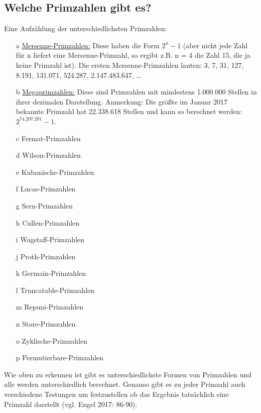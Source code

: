 \documentclass[german,12pt,a4paper]{article}
\begin{document}
\subsection{Welche Primzahlen gibt es?}
Eine Aufzählung der unterschiedlichsten Primzahlen:
\begin{itemize}
\item [a]\underline{Mersenne-Primzahlen:} Diese haben die Form $2^{n}-1$ (aber nicht jede Zahl für n liefert  eine Mersenne-Primzahl, so ergibt z.B. n = 4 die Zahl 15, die ja keine Primzahl ist).
Die ersten Mersenne-Primzahlen lauten: 3, 7, 31, 127, 8.191, 131.071, 524.287, 2.147.483.647, …
\item [b]\underline{Megaprimzahlen:} Diese sind Primzahlen mit mindestens 1.000.000 Stellen in ihrer dezimalen Darstellung.
Anmerkung: Die größte im Januar 2017 bekannte Primzahl hat 22.338.618 Stellen und kann so berechnet werden: $2^{74.207.281}-1$.
\item [c]Fermat-Primzahlen
\item [d]Wilson-Primzahlen
\item [e]Kubanische-Primzahlen
\item [f]Lucas-Primzahlen
\item [g]Sern-Primzahlen
\item [h]Cullen-Primzahlen
\item [i]Wagstaff-Primzahlen
\item [j]Proth-Primzahlen
\item [k]Germain-Primzahlen
\item [l]Truncatable-Primzahlen
\item [m]Repuni-Primzahlen
\item [n]Stare-Primzahlen
\item [o]Zyklische-Primzahlen
\item [p]Permutierbare-Primzahlen
\end{itemize}
Wie oben zu erkennen ist gibt es unterschiedlichste Formen von Primzahlen und alle werden unterschiedlich berechnet. Genauso gibt es zu jeder Primzahl auch verschiedene Testungen um festzustellen ob das Ergebnis tatsächlich eine Primzahl darstellt (vgl. Engel 2017: 86-90).
\end{document}
